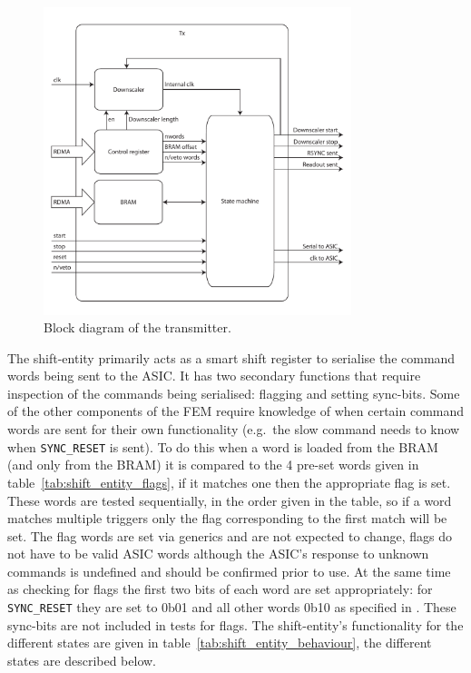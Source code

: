 \begin{figure}[htbp]
  \centering
  \includegraphics[width=0.8\textwidth]{images/pdfs/tx_block.pdf}
  \caption{Block diagram of the transmitter.}
  \label{fig:tx_entity}
\end{figure}
        
The shift-entity primarily acts as a smart shift register to serialise the command words being sent to the ASIC. It has two secondary functions that require inspection of the commands being serialised: flagging and setting sync-bits. Some of the other components of the FEM require knowledge of when certain command words are sent for their own functionality (e.g.\ the slow command needs to know when \texttt{SYNC\_RESET} is sent). To do this when a word is loaded from the BRAM (and only from the BRAM) it is compared to the 4 pre-set words given in table~\ref{tab:shift_entity_flags}, if it matches one then the appropriate flag is set. These words are tested sequentially, in the order given in the table, so if a word matches multiple triggers only the flag corresponding to the first match will be set. The flag words are set via generics and are not expected to change, flags do not have to be valid ASIC words although the ASIC's response to unknown commands is undefined and should be confirmed prior to use. At the same time as checking for flags the first two bits of each word are set appropriately: for \texttt{SYNC\_RESET} they are set to 0b01 and all other words 0b10 as specified in \cite{lpd_manual}. These sync-bits are not included in tests for flags. The shift-entity's functionality for the different states are given in table~\ref{tab:shift_entity_behaviour}, the different states are described below.

